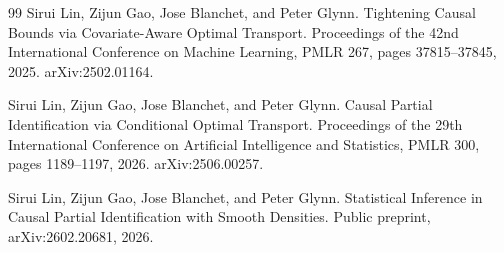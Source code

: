 \documentclass{article}
\begin{document}
\begin{thebibliography}{99}
   Sirui Lin, Zijun Gao, Jose Blanchet, and Peter Glynn. Tightening Causal Bounds via Covariate-Aware Optimal Transport. Proceedings of the 42nd International Conference on Machine Learning, PMLR 267, pages 37815--37845, 2025. arXiv:2502.01164.

   Sirui Lin, Zijun Gao, Jose Blanchet, and Peter Glynn. Causal Partial Identification via Conditional Optimal Transport. Proceedings of the 29th International Conference on Artificial Intelligence and Statistics, PMLR 300, pages 1189--1197, 2026. arXiv:2506.00257.

   Sirui Lin, Zijun Gao, Jose Blanchet, and Peter Glynn. Statistical Inference in Causal Partial Identification with Smooth Densities. Public preprint, arXiv:2602.20681, 2026.

\end{thebibliography}
\end{document}
